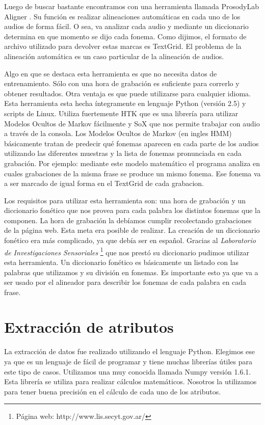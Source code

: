 Luego de buscar bastante encontramos con una herramienta llamada ProsodyLab Aligner \cite{prosodylab}. Su función es realizar alineaciones automáticas en cada uno de los audios de forma fácil. O sea, va analizar cada audio y mediante un diccionario determina en que momento se dijo cada fonema. Como dijimos, el formato de archivo utilizado para devolver estas marcas es TextGrid. El problema de la alineación automática es un caso particular de la alineación de audios.

Algo en que se destaca esta herramienta es que no necesita datos de entrenamiento. Sólo con una hora de grabación es suficiente para correrlo y obtener resultados. Otra ventaja es que puede utilizarse para cualquier idioma. Esta herramienta esta hecha íntegramente en lenguaje Python (versión 2.5) y scripts de Linux. Utiliza fuertemente HTK que es una librería para utilizar Modelos Ocultos de Markov fácilmente y SoX que nos permite trabajar con audio a través de la consola. Los Modelos Ocultos de Markov \cite{rabiner} (en ingles HMM) básicamente tratan de predecir qué fonemas aparecen en cada parte de los audios utilizando las diferentes muestras y la lista de fonemas pronunciada en cada grabación. Por ejemplo: mediante este modelo matemático el programa analiza en cuales grabaciones de la misma frase se produce un mismo fonema. Ese fonema va a ser marcado de igual forma en el TextGrid de cada grabacion.

Los requisitos para utilizar esta herramienta son: una hora de grabación y un diccionario fonético que nos provea para cada palabra los distintos fonemas que la componen. La hora de grabación la debíamos cumplir recolectando grabaciones de la página web. Esta meta era posible de realizar. La creación de un diccionario fonético era más complicado, ya que debía ser en español. Gracias al \textit{Laboratorio de Investigaciones Sensoriales} \footnote{Página web: http://www.lis.secyt.gov.ar/} que nos prestó su diccionario pudimos utilizar esta herramienta. Un diccionario fonético es básicamente un listado con las palabras que utilizamos y su división en fonemas. Es importante esto ya que va a ser usado por el alineador para describir los fonemas de cada palabra en cada frase.

\section{Extracción de atributos}

La extracción de datos fue realizado utilizando el lenguaje Python. Elegimos ese ya que es un lenguaje de fácil de programar y tiene muchas librerías útiles para este tipo de casos. Utilizamos una muy conocida llamada Numpy versión 1.6.1. Esta librería se utiliza para realizar cálculos matemáticos. Nosotros la utilizamos para tener buena precisión en el cálculo de cada uno de los atributos.

